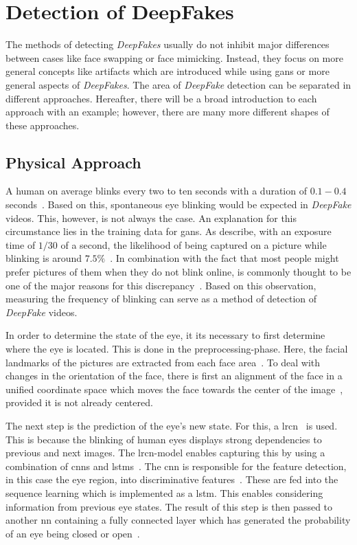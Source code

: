 \section{Detection of DeepFakes}\label{sect:detection}
The methods of detecting \textit{DeepFakes} usually do not inhibit major differences
between cases like face swapping or face mimicking.
Instead, they focus on more general concepts like artifacts which are introduced
while using \glspl{gan} or more general aspects of \textit{DeepFakes}.
The area of \textit{DeepFake} detection can be separated in different approaches.
Hereafter, there will be a broad introduction to each approach with an example; however, there
are many more different shapes of these approaches.

\subsection{Physical Approach}
A human on average blinks every two to ten seconds with a duration of \(0.1-0.4\)
seconds~\cite{li_ictu_2018}. Based on this, spontaneous eye blinking would be
expected in \textit{DeepFake} videos. This, however, is not always the case. An
explanation for this circumstance lies in the training data for \glspl{gan}. As 
\textcite{li_ictu_2018} describe, with an exposure time of \(1/30\) of a second,
the likelihood of being captured on a picture while blinking is around \(7.5\%\)~\cite{li_ictu_2018}.
In combination with the fact that most people might prefer pictures of them when
they do not blink online, is commonly thought to be one of the major reasons for
this discrepancy~\cite{pishori_detecting_2020}. Based on this observation, measuring the frequency of blinking can serve as a method of detection of
\textit{DeepFake} videos.

\par
In order to determine the state of the eye, it its necessary to first determine
where the eye is located. This is done in the preprocessing-phase. Here, the facial
landmarks of the pictures are extracted from each face area~\cite{li_ictu_2018}.
To deal with changes in the orientation of the face, there is first an alignment
of the face in a unified coordinate space which moves the face towards the center of the image~\cite{li_ictu_2018}, provided it is not already centered.

\par
The next step is the prediction of the eye's new state. For this, a \gls{lrcn}~\cite{donahue_long-term_2014}
is used. This is because the blinking of human eyes displays strong dependencies to
previous and next images. The \gls{lrcn}-model enables capturing this by using
a combination of \glspl{cnn} and \glspl{lstm}~\cite{donahue_long-term_2014}.
The \gls{cnn} is responsible for the feature detection, in this case the eye
region, into discriminative features~\cite{li_ictu_2018,donahue_long-term_2014}. 
These are fed into the sequence learning which is implemented as a \gls{lstm}.
This enables considering information from previous eye states. The result of
this step is then passed to another \gls{nn} containing a fully connected layer
which has generated the probability of an eye being closed or open~\cite{li_ictu_2018}.


